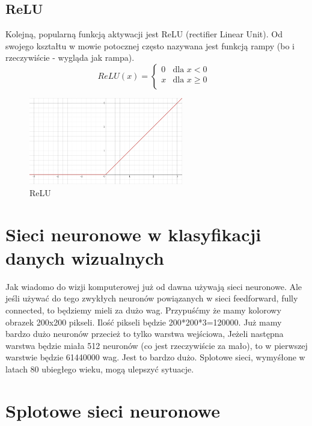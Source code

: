 \documentclass{article}
\begin{document}
\subsection{ReLU}
Kolejną, popularną funkcją aktywacji jest ReLU (rectifier Linear Unit). Od swojego kształtu w mowie potocznej często nazywana jest funkcją rampy (bo i rzeczywiście - wygląda jak rampa).
\begin{equation}
	ReLU(x) = 
	\begin{cases}
		0 & \text{dla $x < 0$}\\
		x & \text{dla $x \geqslant 0$ }\\
	\end{cases}    
\end{equation}

\begin{figure}[H]
	\centering
	\includegraphics[width=0.6\textwidth,keepaspectratio=true]{ReLu}
	\caption{
		ReLU
	}
\end{figure}

\section{Sieci neuronowe w klasyfikacji danych wizualnych}
Jak wiadomo do wizji komputerowej już od dawna używają sieci neuronowe. Ale jeśli używać do tego zwykłych neuronów powiązanych w sieci feedforward, fully connected, to będziemy mieli za dużo wag. Przypuśćmy że mamy kolorowy obrazek 200x200 pikseli. Ilość pikseli będzie 200*200*3=120000. Już mamy bardzo dużo neuronów przecież to tylko warstwa wejściowa, Jeżeli następna warstwa będzie miała 512 neuronów (co jest rzeczywiście za mało), to w pierwszej warstwie będzie 61440000 wag. Jest to bardzo dużo. 
Splotowe sieci, wymyśłone w latach 80 ubiegłego wieku, mogą ulepszyć sytuacje.


\section{Splotowe sieci neuronowe}
\end{document}
